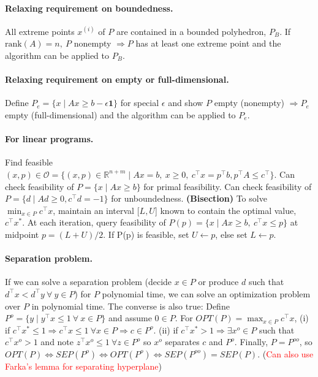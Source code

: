 \documentclass{article}
\begin{document}
\paragraph{Relaxing requirement on boundedness.} All extreme points $x^{(i)}$ of $P$ are contained in a bounded polyhedron, $P_B$. If $\text{rank}(A)=n,\ P$ nonempty $\Longrightarrow P$ has at least one extreme point and the algorithm can be applied to $P_B$. 

\paragraph{Relaxing requirement on empty or full-dimensional.} Define $P_e = \{x\mid Ax \geq b - \epsilon \mathbf{1}\}$ for special $\epsilon$ and show $P$ empty (nonempty) $\Rightarrow P_e$ empty (full-dimensional) and the algorithm can be applied to $P_e$. 

\paragraph{For linear programs.} Find feasible $(x,p)\in\mathcal O = \{(x,p)\in \mathbb R^{n+m}\mid Ax=b,\ x\geq0,\ c^\top x = p^\top b, p^\top A \leq c^\top\}$. Can check feasibility of $P=\{x\mid Ax\geq b\}$ for primal feasibility. Can check feasibility of $P=\{d\mid Ad\geq 0, c^\top d = -1\}$ for unboundedness. \textbf{(Bisection)} To solve $\min_{x\in P} c^\top x$, maintain an interval $[L,U$] known to contain the optimal value, $c^\top x^*$. At each iteration, query feasibility of $P(p) = \{x \mid Ax \ge b,\ c^\top x \le p\}$ at midpoint $p=(L+U)/2$. If P(p) is feasible, set $U \leftarrow p$, else set $L \leftarrow p$.

\paragraph{Separation problem.} If we can solve a separation problem (decide $x\in P$ or produce $d$ such that $d^\top x < d^\top y\ \forall\ y\in P$) for $P$ polynomial time, we can solve an optimization problem over $P$ in polynomial time. The converse is also true: Define $P^o = \{y \mid y^\top x \leq 1\ \forall \ x \in P\}$ and assume $0\in P$. For $OPT(P) = \max_{x\in P}c^\top x$, (i) if $c^\top x^* \leq 1 \Longrightarrow c^\top x \leq 1\ \forall x\in P \Longrightarrow c\in P^o$. (ii) if $c^\top x^* > 1 \Longrightarrow \exists x^o\in P$ such that $c^\top x^o > 1$ and note $z^\top x^o \leq 1\ \forall z \in P^o$ so $x^o$ separates $c$ and $P^o$. Finally, $P = P^{oo}$, so $OPT(P) \iff SEP(P^o) \iff OPT(P^o) \iff SEP(P^{oo}) = SEP(P)$. (\textcolor{red}{Can also use Farka's lemma for separating hyperplane})
\end{document}
